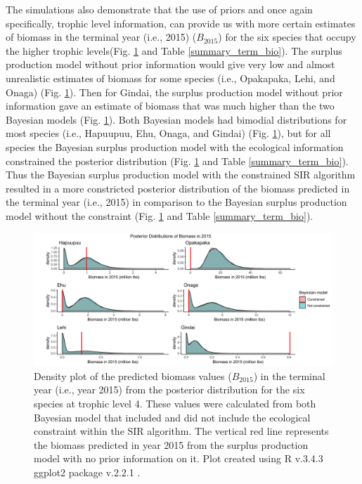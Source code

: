 \documentclass[oneside,12pt,final]{sty/ucthesis-CA2012}
\let\cite\citep                             %
\begin{document}
\begin{mainmatter}
The simulations also demonstrate that the use of priors and once again specifically, trophic level information, can provide us with more certain estimates of biomass in the terminal year (i.e., 2015) ($B_{2015}$) for the six species that occupy the higher trophic levels(Fig. \ref{post_terminal} and Table \ref{summary_term_bio}). The surplus production model without prior information would give very low and almost unrealistic estimates of biomass for some species (i.e.,  Opakapaka, Lehi, and Onaga) (Fig. \ref{post_terminal}). Then for Gindai, the surplus production model without prior information gave an estimate of biomass that was much higher than the two Bayesian models (Fig. \ref{post_terminal}). Both Bayesian models had bimodial distributions for most species (i.e., Hapuupuu, Ehu, Onaga, and Gindai) (Fig. \ref{post_terminal}), but for all species the Bayesian surplus production model with the ecological information constrained the posterior distribution (Fig. \ref{post_terminal} and Table \ref{summary_term_bio}). Thus the Bayesian surplus production model with the constrained SIR algorithm resulted in a more constricted posterior distribution of the biomass predicted in the terminal year (i.e., 2015) in comparison to the Bayesian surplus production model without the constraint (Fig. \ref{post_terminal} and Table \ref{summary_term_bio}). 

\begin{figure}[H]
     \centering
       \includegraphics[width=\textwidth]{fig/post_terminal_bio}
    \caption{Density plot of the predicted biomass values ($B_{2015}$) in the terminal year (i.e., year 2015) from the posterior distribution for the six species at trophic level 4. These values were calculated from both Bayesian model that included and did not include the ecological constraint within the SIR algorithm. The vertical red line represents the biomass predicted in year 2015 from the surplus production model with no prior information on it. Plot created using R v.3.4.3 \cite{Rcite} ggplot2 package v.2.2.1 \cite{ggplot}.}
    \label{post_terminal}
\end{figure}


\end{mainmatter}
\end{document}
